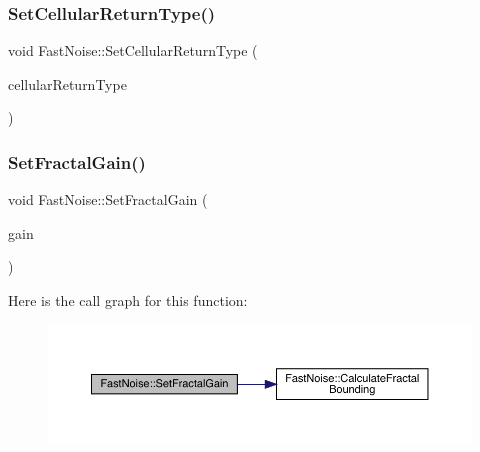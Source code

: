 \mbox{\label{class_fast_noise_ac643a011759d70ed71651774f53f1c65}} 
\subsubsection{\texorpdfstring{Set\+Cellular\+Return\+Type()}{SetCellularReturnType()}}
{\footnotesize\ttfamily void Fast\+Noise\+::\+Set\+Cellular\+Return\+Type (\begin{DoxyParamCaption}\item[{\mbox{\hyperlink{class_fast_noise_a942d73b97b870138c9a07249d5a57737}{Cellular\+Return\+Type}}}]{cellular\+Return\+Type }\end{DoxyParamCaption})\hspace{0.3cm}{\ttfamily [inline]}}

\mbox{\label{class_fast_noise_abbd1dd9839957f18f5eaf8b2b61610ac}} 
\subsubsection{\texorpdfstring{Set\+Fractal\+Gain()}{SetFractalGain()}}
{\footnotesize\ttfamily void Fast\+Noise\+::\+Set\+Fractal\+Gain (\begin{DoxyParamCaption}\item[{\mbox{\hyperlink{_fast_noise_8h_a75a9ef6d2541c4921815b885bfd449c3}{F\+N\+\_\+\+D\+E\+C\+I\+M\+AL}}}]{gain }\end{DoxyParamCaption})\hspace{0.3cm}{\ttfamily [inline]}}

Here is the call graph for this function\+:
\nopagebreak
\begin{figure}[H]
\begin{center}
\leavevmode
\includegraphics[width=350pt]{class_fast_noise_abbd1dd9839957f18f5eaf8b2b61610ac_cgraph}
\end{center}
\end{figure}
\mbox{\label{class_fast_noise_a2e5e8651bc949144ade310c748518fc2}} 
